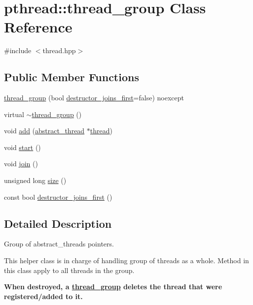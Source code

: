\hypertarget{classpthread_1_1thread__group}{}\section{pthread\+:\+:thread\+\_\+group Class Reference}
\label{classpthread_1_1thread__group}


{\ttfamily \#include $<$thread.\+hpp$>$}

\subsection*{Public Member Functions}
\begin{DoxyCompactItemize}
\item 
\hyperlink{classpthread_1_1thread__group_a9aeb2ffef16dc16d2753f2e6c63ff466}{thread\+\_\+group} (bool \hyperlink{classpthread_1_1thread__group_a67df7bb484fb8657228a909a126489d3}{destructor\+\_\+joins\+\_\+first}=false) noexcept
\item 
virtual \hyperlink{classpthread_1_1thread__group_a2aeeb86d1523e2a7c175df3162331e4f}{$\sim$thread\+\_\+group} ()
\item 
void \hyperlink{classpthread_1_1thread__group_ae9fa9ce6e7b4c2222d04a446b3c23ca0}{add} (\hyperlink{classpthread_1_1abstract__thread}{abstract\+\_\+thread} $\ast$\hyperlink{classpthread_1_1thread}{thread})
\item 
void \hyperlink{classpthread_1_1thread__group_aaba00cf80d72cd986526384482457968}{start} ()
\item 
void \hyperlink{classpthread_1_1thread__group_a39937a77e1059e352c9b39407a866f6e}{join} ()
\item 
unsigned long \hyperlink{classpthread_1_1thread__group_a4b1a04ee731bba608193b089cc1d50a1}{size} ()
\item 
const bool \hyperlink{classpthread_1_1thread__group_a67df7bb484fb8657228a909a126489d3}{destructor\+\_\+joins\+\_\+first} ()
\end{DoxyCompactItemize}


\subsection{Detailed Description}
Group of abstract\+\_\+threads pointers.

This helper class is in charge of handling group of threads as a whole. Method in this class apply to all threads in the group.

{\bfseries When destroyed, a \hyperlink{classpthread_1_1thread__group}{thread\+\_\+group} deletes the thread that were registered/added to it.}


